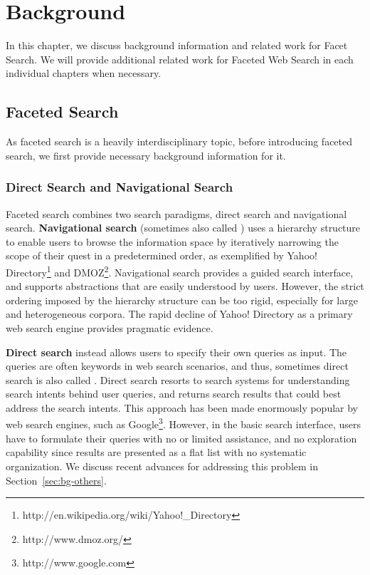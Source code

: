 \chapter{Background}
\label{ch:bg}
In this chapter, we discuss background information and related work for Facet Search. We will provide additional related work for Faceted Web Search in each individual chapters when necessary.

\section{Faceted Search}
As faceted search is a heavily interdisciplinary topic, before introducing faceted search, we first provide necessary background information for it.
\subsection{Direct Search and Navigational Search}
Faceted search combines two search paradigms, direct search and navigational search. \textbf{Navigational search} (sometimes also called ) uses a hierarchy structure to enable users to browse the information space by iteratively narrowing the scope of their quest in a predetermined order, as exemplified by Yahoo! Directory\footnote{http://en.wikipedia.org/wiki/Yahoo!\_Directory} and DMOZ\footnote{http://www.dmoz.org/}. Navigational search provides a guided search interface, and supports abstractions that are easily understood by users. However, the strict ordering imposed by the hierarchy structure can be too rigid, especially for large and heterogeneous corpora. The rapid decline of Yahoo! Directory as a primary web search engine provides pragmatic evidence.

\textbf{Direct search} instead allows users to specify their own queries as input. The queries are often keywords in web search scenarios, and thus, sometimes direct search is also called . Direct search resorts to search systems for understanding search intents behind user queries, and returns search results that could best address the search intents. This approach has been made enormously popular by web search engines, such as Google\footnote{http://www.google.com}. However, in the basic search interface, users have to formulate their queries with no or limited assistance, and no exploration capability since results are presented as a flat list with no systematic organization. We discuss recent advances for addressing this problem in Section~\ref{sec:bg-others}.

